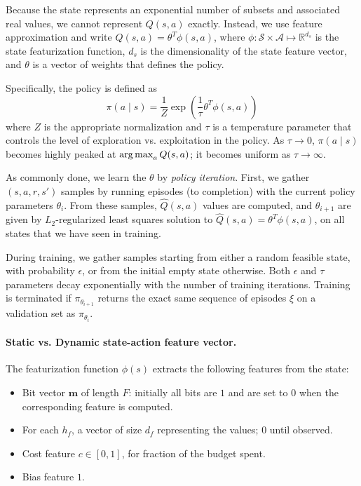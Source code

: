 Because the state represents an exponential number of subsets and associated real values, we cannot represent $Q(s,a)$ exactly.
Instead, we use feature approximation and write $Q(s,a) = \theta^T \phi(s, a)$,  where $\phi: \mathcal{S} \times \mathcal{A} \mapsto \mathbb{R}^{d_s}$ is the state featurization function, $d_s$ is the dimensionality of the state feature vector, and $\theta$ is a vector of weights that defines the policy.

Specifically, the policy is defined as
\begin{equation}
\pi(a \mid s) = \frac{1}{Z} \exp\left(\frac{1}{\tau} \theta^T \phi(s, a)\right)
\end{equation}
where $Z$ is the appropriate normalization and $\tau$ is a temperature parameter that controls the level of exploration vs. exploitation in the policy.
As $\tau \rightarrow 0$, ${\pi(a \mid s)}$ becomes highly peaked at $\operatorname*{arg\,max}_a Q(s,a)$; it becomes uniform as $\tau \rightarrow \infty$.

As commonly done, we learn the $\theta$ by \emph{policy iteration}.
First, we gather $(s, a, r, s')$ samples by running episodes (to completion) with the current policy parameters $\theta_i$.
From these samples, $\hat{Q}(s, a)$ values are computed, and $\theta_{i+1}$ are given by $L_2$-regularized least squares solution to $\hat{Q}(s, a) = \theta^T \phi(s, a)$, on all states that we have seen in training.

During training, we gather samples starting from either a random feasible state, with probability $\epsilon$, or from the initial empty state otherwise.
Both $\epsilon$ and $\tau$ parameters decay exponentially with the number of training iterations.
Training is terminated if $\pi_{\theta_{i+1}}$ returns the exact same sequence of episodes $\xi$ on a validation set as $\pi_{\theta_{i}}$.

\paragraph{Static vs. Dynamic state-action feature vector.}\label{sec:policy_features}
The featurization function $\phi(s)$ extracts the following features from the state:
\begin{itemize}\addtolength{\itemsep}{-.5\baselineskip}
\item Bit vector $\textbf{m}$ of length $F$: initially all bits are $1$ and are set to $0$ when the corresponding feature is computed.
\item For each $h_f$, a vector of size $d_f$ representing the values; $0$ until observed.
\item Cost feature $c \in [0, 1]$, for fraction of the budget spent.
\item Bias feature $1$.
\end{itemize}

